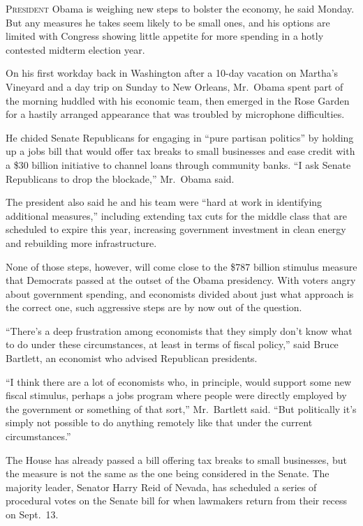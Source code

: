 ﻿\documentclass[12pt]{article}
\begin{document}
\lettrine{P}{resident} Obama is weighing new steps to bolster the economy,
he said Monday. But any measures he takes seem likely to be small ones, and his options are limited
with Congress showing little appetite for more spending in a hotly contested midterm election year.

On his first workday back in Washington after a 10-day vacation on Martha's Vineyard and a day trip
on Sunday to New Orleans, Mr.~Obama spent part of the morning huddled with his economic team, then
emerged in the Rose Garden for a hastily arranged appearance that was troubled by microphone
difficulties.

He chided Senate Republicans for engaging in ``pure partisan politics'' by holding up a jobs bill
that would offer tax breaks to small businesses and ease credit with a \$30 billion initiative to
channel loans through community banks. ``I ask Senate Republicans to drop the blockade,'' Mr.~Obama
said.

The president also said he and his team were ``hard at work in identifying additional measures,''
including extending tax cuts for the middle class that are scheduled to expire this year, increasing
government investment in clean energy and rebuilding more infrastructure.

None of those steps, however, will come close to the \$787 billion stimulus measure that Democrats
passed at the outset of the Obama presidency. With voters angry about government spending, and
economists divided about just what approach is the correct one, such aggressive steps are by now out
of the question.

``There's a deep frustration among economists that they simply don't know what to do under these
circumstances, at least in terms of fiscal policy,'' said Bruce Bartlett, an economist who advised
Republican presidents.

``I think there are a lot of economists who, in principle, would support some new fiscal stimulus,
perhaps a jobs program where people were directly employed by the government or something of that
sort,'' Mr.~Bartlett said. ``But politically it's simply not possible to do anything remotely like
that under the current circumstances.''

The House has already passed a bill offering tax breaks to small businesses, but the measure is not
the same as the one being considered in the Senate. The majority leader, Senator Harry Reid of
Nevada, has scheduled a series of procedural votes on the Senate bill for when lawmakers return from
their recess on Sept.~13.
\end{document}
